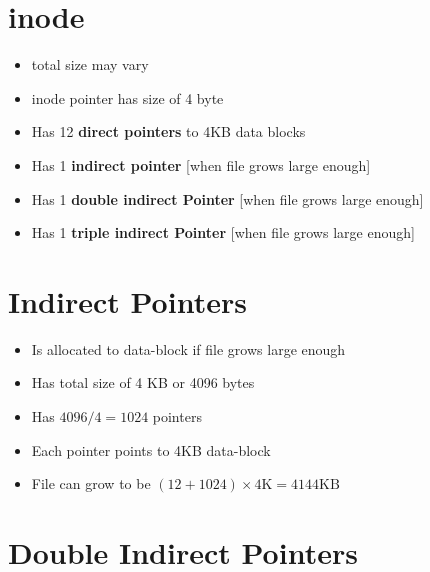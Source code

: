 \documentclass[12pt]{article}
\begin{document}
\section*{inode}

\begin{itemize}
    \item total size may vary
    \item inode pointer has size of 4 byte
    \item Has 12 \textbf{direct pointers} to 4KB data blocks
    \item Has 1 \textbf{indirect pointer} [when file grows large enough]
    \item Has 1 \textbf{double indirect Pointer} [when file grows large enough]
    \item Has 1 \textbf{triple indirect Pointer} [when file grows large enough]
\end{itemize}

\section*{Indirect Pointers}

\begin{itemize}
    \item Is allocated to data-block if file grows large enough
    \item Has total size of 4 KB or 4096 bytes
    \item Has $4096/4 = 1024$ pointers
    \item Each pointer points to 4KB data-block
    \item File can grow to be $(12 + 1024) \times 4\text{K} = 4144\text{KB}$
\end{itemize}

\section*{Double Indirect Pointers}
\end{document}
